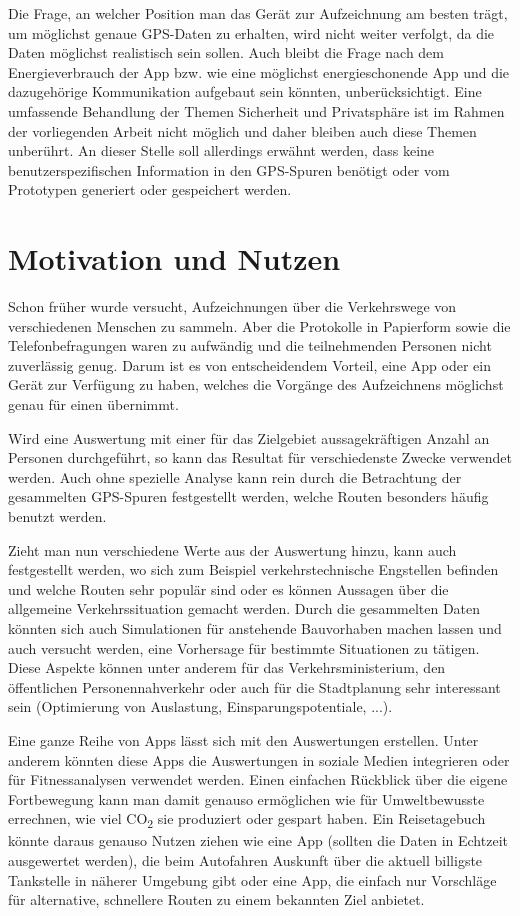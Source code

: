 Die Frage, an welcher Position man das Gerät zur Aufzeichnung am besten trägt, um möglichst genaue GPS-Daten zu erhalten, wird nicht weiter verfolgt, da die Daten möglichst realistisch sein sollen. Auch bleibt die Frage nach dem Energieverbrauch der App bzw. wie eine möglichst energieschonende App und die dazugehörige Kommunikation aufgebaut sein könnten, unberücksichtigt. Eine umfassende Behandlung der Themen Sicherheit und Privatsphäre ist im Rahmen der vorliegenden Arbeit nicht möglich und daher bleiben auch diese Themen unberührt. An dieser Stelle soll allerdings erwähnt werden, dass keine benutzerspezifischen Information in den GPS-Spuren benötigt oder vom Prototypen generiert oder gespeichert werden.

\section{Motivation und Nutzen}
Schon früher wurde versucht, Aufzeichnungen über die Verkehrswege von verschiedenen Menschen zu sammeln. Aber die Protokolle in Papierform sowie die Telefonbefragungen waren zu aufwändig und die teilnehmenden Personen nicht zuverlässig genug. Darum ist es von entscheidendem Vorteil, eine App oder ein Gerät zur Verfügung zu haben, welches die Vorgänge des Aufzeichnens möglichst genau für einen übernimmt. \cite{zheng_understanding_2010}

Wird eine Auswertung mit einer für das Zielgebiet aussagekräftigen Anzahl an Personen durchgeführt, so kann das Resultat  für verschiedenste Zwecke verwendet werden. Auch ohne spezielle Analyse kann rein durch die Betrachtung der gesammelten GPS-Spuren festgestellt werden, welche Routen besonders häufig benutzt werden.

Zieht man nun verschiedene Werte aus der Auswertung hinzu, kann auch festgestellt werden, wo sich zum Beispiel verkehrstechnische Engstellen befinden und welche Routen sehr populär sind oder es können Aussagen über die allgemeine Verkehrssituation gemacht werden. Durch die gesammelten Daten könnten sich auch Simulationen für anstehende Bauvorhaben machen lassen und auch versucht werden, eine Vorhersage für bestimmte Situationen zu tätigen. Diese Aspekte können unter anderem für das Verkehrsministerium,  den öffentlichen Personennahverkehr oder auch für die Stadtplanung sehr interessant sein (Optimierung von Auslastung, Einsparungspotentiale, ...).

Eine ganze Reihe von Apps lässt sich mit den Auswertungen erstellen. Unter anderem könnten diese Apps die Auswertungen in soziale Medien integrieren oder für Fitnessanalysen verwendet werden. Einen einfachen Rückblick über die eigene Fortbewegung kann man damit genauso ermöglichen wie für Umweltbewusste errechnen, wie viel CO\textsubscript{2} sie produziert oder gespart haben. Ein Reisetagebuch könnte daraus genauso Nutzen ziehen wie eine App (sollten die Daten in Echtzeit ausgewertet werden), die beim Autofahren Auskunft über die aktuell billigste Tankstelle in näherer Umgebung gibt oder eine App, die einfach nur Vorschläge für alternative, schnellere Routen zu einem bekannten Ziel anbietet.

